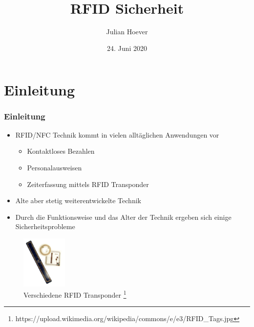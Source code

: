 \documentclass{beamer}
\title{RFID Sicherheit}
\author{Julian Hoever}
\date{24. Juni 2020}
\begin{document}
\begin{frame}
\titlepage
\end{frame}


\section{Einleitung}
\begin{frame}
\frametitle{Einleitung}


\begin{itemize}
	\item RFID/NFC Technik kommt in vielen alltäglichen Anwendungen vor
	\begin{itemize}
		\item Kontaktloses Bezahlen
		\item Personalausweisen
		\item Zeiterfassung mittels RFID Transponder
	\end{itemize}
	\item Alte aber stetig weiterentwickelte Technik
	\item Durch die Funktionsweise und das Alter der Technik ergeben sich einige Sicherheitsprobleme
\end{itemize}

\begin{figure}
\includegraphics[width=0.2\textwidth]{img/RFID_Tags.jpg}
\caption{Verschiedene RFID Transponder \footnote{https://upload.wikimedia.org/wikipedia/commons/e/e3/RFID\_Tags.jpg}}
\end{figure}
\end{frame}
\end{document}
